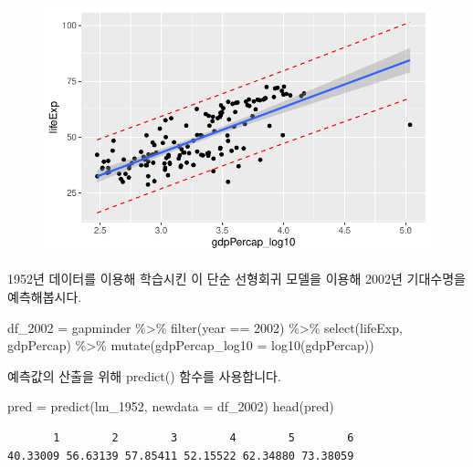 \documentclass[
  letterpaper,
  DIV=11,
  numbers=noendperiod]{scrartcl}
\newenvironment{Shaded}{\begin{snugshade}}{\end{snugshade}}
\newcommand{\AttributeTok}[1]{\textcolor[rgb]{0.40,0.45,0.13}{#1}}
\newcommand{\DecValTok}[1]{\textcolor[rgb]{0.68,0.00,0.00}{#1}}
\newcommand{\FunctionTok}[1]{\textcolor[rgb]{0.28,0.35,0.67}{#1}}
\newcommand{\NormalTok}[1]{\textcolor[rgb]{0.00,0.23,0.31}{#1}}
\newcommand{\OtherTok}[1]{\textcolor[rgb]{0.00,0.23,0.31}{#1}}
\newcommand{\SpecialCharTok}[1]{\textcolor[rgb]{0.37,0.37,0.37}{#1}}
\begin{document}
\begin{figure}[H]

{\centering \includegraphics{LinearRegression_files/figure-pdf/unnamed-chunk-9-1.pdf}

}

\end{figure}

1952년 데이터를 이용해 학습시킨 이 단순 선형회귀 모델을 이용해 2002년
기대수명을 예측해봅시다.

\begin{Shaded}
\begin{Highlighting}[]
\NormalTok{df\_2002 }\OtherTok{=}\NormalTok{ gapminder }\SpecialCharTok{\%\textgreater{}\%}
  \FunctionTok{filter}\NormalTok{(year }\SpecialCharTok{==} \DecValTok{2002}\NormalTok{) }\SpecialCharTok{\%\textgreater{}\%}
  \FunctionTok{select}\NormalTok{(lifeExp, gdpPercap) }\SpecialCharTok{\%\textgreater{}\%}
  \FunctionTok{mutate}\NormalTok{(}\AttributeTok{gdpPercap\_log10 =} \FunctionTok{log10}\NormalTok{(gdpPercap))}
\end{Highlighting}
\end{Shaded}

예측값의 산출을 위해 predict() 함수를 사용합니다.

\begin{Shaded}
\begin{Highlighting}[]
\NormalTok{pred }\OtherTok{=} \FunctionTok{predict}\NormalTok{(lm\_1952, }\AttributeTok{newdata =}\NormalTok{ df\_2002)}
\FunctionTok{head}\NormalTok{(pred)}
\end{Highlighting}
\end{Shaded}

\begin{verbatim}
       1        2        3        4        5        6 
40.33009 56.63139 57.85411 52.15522 62.34880 73.38059 
\end{verbatim}
\end{document}
